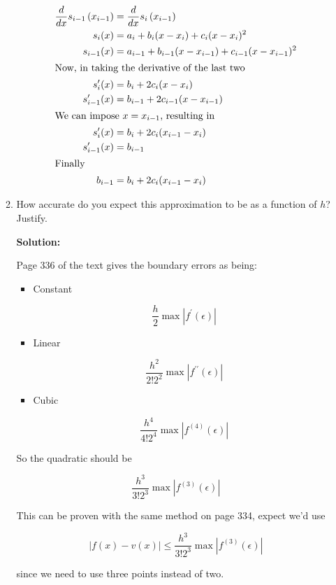 \documentclass[12pt]{article}
\newcommand{\abs}[1]{\left| #1 \right|}
\renewcommand{\P}[1]{\left( #1 \right)}
\begin{document}
\begin{enumerate}
\begin{enumerate}
  \begin{align*}
    \frac{d}{dx}s_{i-1}\P{x_{i-1}} &= \frac{d}{dx}s_{i}\P{x_{i-1}}\\
    s_{i}(x) &= a_{i} + b_{i}(x - x_{i}) + c_{i}(x - x_{i})^{2}\\
    s_{i-1}(x) &= a_{i-1} + b_{i-1}(x - x_{i-1}) + c_{i-1}(x - x_{i-1})^{2}\\
    \intertext{Now, in taking the derivative of the last two}
    s_{i}^{\prime}(x) &= b_{i} + 2c_{i}(x - x_{i})\\
    s_{i-1}^{\prime}(x) &= b_{i-1} + 2c_{i-1}(x - x_{i-1})\\
    \intertext{We can impose $x = x_{i-1}$, resulting in}
    s_{i}^{\prime}(x) &= b_{i} + 2c_{i}(x_{i-1} - x_{i})\\
    s_{i-1}^{\prime}(x) &= b_{i-1}\\
    \intertext{Finally}
    b_{i-1} &= b_{i} + 2c_{i}(x_{i-1} - x_{i})
  \end{align*}

  \item How accurate do you expect this approximation to be as a function of $h$? Justify.

  {\bf Solution:}

  Page 336 of the text gives the boundary errors as being:
  \begin{itemize}
    \item {\sc Constant}

      \[
          \frac{h}{2}\max{\abs{f^{\prime}(\epsilon)}}
      \]

    \item {\sc Linear}

    \[
        \frac{h^{2}}{2!2^{2}}\max{\abs{f^{\prime\prime}(\epsilon)}}
    \]

    \item {\sc Cubic}

    \[
        \frac{h^4}{4!2^4}\max{\abs{f^{(4)}(\epsilon)}}
    \]
  \end{itemize}

  So the quadratic should be

  \[
      \frac{h^3}{3!2^3}\max{\abs{f^{(3)}(\epsilon)}}
  \]

  This can be proven with the same method on page 334, expect we'd use

  \[
      \abs{f(x) - v(x)} \leq \frac{h^{3}}{3!2^3}\max{\abs{f^{(3)}(\epsilon)}}
  \]

  since we need to use three points instead of two.


\end{enumerate}
\end{enumerate}
\end{document}
